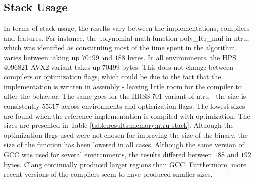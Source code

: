 \subsection{Stack Usage}

In terms of stack usage, the results vary between the implementations, compilers and features. For instance, the polynomial math function poly\_Rq\_mul in \gls{ntru}, which was identified as constituting most of the time spent in the algorithm, varies between taking up $70499$ and $188$ bytes. In all environments, the HPS 4096821 AVX2 variant takes up $70499$ bytes. This does not change between compilers or optimization flags, which could be due to the fact that the implementation is written in assembly - leaving little room for the compiler to alter the behavior. The same goes for the HRSS 701 variant of \gls{ntru} - the size is consistently $55317$ across environments and optimization flags. The lowest sizes are found when the reference implementation is compiled with optimization. The sizes are presented in Table \ref{table:results:memory:ntru-stack}. Although the optimization flags used were not chosen for improving the size of the binary, the size of the function has been lowered in all cases. Although the same version of GCC was used for several environments, the results differed between $188$ and $192$ bytes. Clang continually produced larger regions than GCC. Furthermore, more recent versions of the compilers seem to have produced smaller sizes.


